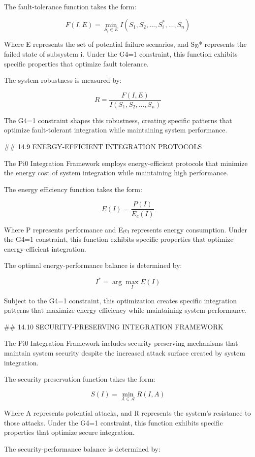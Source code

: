 The fault-tolerance function takes the form:

$$F(I, E) = \min_{S_i \in E} I(S_1, S_2, ..., S_i^*, ..., S_n)$$

Where E represents the set of potential failure scenarios, and S₍ᵢ₎* represents the failed state of subsystem i. Under the G4=1 constraint, this function exhibits specific properties that optimize fault tolerance.

The system robustness is measured by:

$$R = \frac{F(I, E)}{I(S_1, S_2, ..., S_n)}$$

The G4=1 constraint shapes this robustness, creating specific patterns that optimize fault-tolerant integration while maintaining system performance.

## 14.9 ENERGY-EFFICIENT INTEGRATION PROTOCOLS

The Pi0 Integration Framework employs energy-efficient protocols that minimize the energy cost of system integration while maintaining high performance.

The energy efficiency function takes the form:

$$E(I) = \frac{P(I)}{E_c(I)}$$

Where P represents performance and E₍c₎ represents energy consumption. Under the G4=1 constraint, this function exhibits specific properties that optimize energy-efficient integration.

The optimal energy-performance balance is determined by:

$$I^* = \arg\max_I E(I)$$

Subject to the G4=1 constraint, this optimization creates specific integration patterns that maximize energy efficiency while maintaining system performance.

## 14.10 SECURITY-PRESERVING INTEGRATION FRAMEWORK

The Pi0 Integration Framework includes security-preserving mechanisms that maintain system security despite the increased attack surface created by system integration.

The security preservation function takes the form:

$$S(I) = \min_{A \in \mathcal{A}} R(I, A)$$

Where A represents potential attacks, and R represents the system's resistance to those attacks. Under the G4=1 constraint, this function exhibits specific properties that optimize secure integration.

The security-performance balance is determined by:

